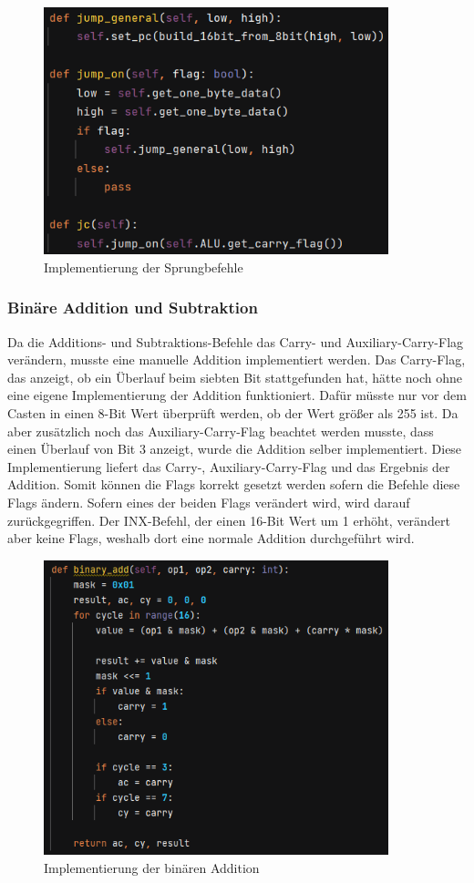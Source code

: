 \documentclass[12pt]{article}
\newcommand{\imgSpaceBefore}{\vspace{10pt}}
\begin{document}
\imgSpaceBefore
\begin{figure}[H]
\centering
\includegraphics[width=10cm]{Bilder/JumpVariants}
\caption{Implementierung der Sprungbefehle}
\label{fig:JumpVariants}
\end{figure}


\subsubsection{Binäre Addition und Subtraktion}
Da die Additions- und Subtraktions-Befehle das Carry- und Auxiliary-Carry-Flag verändern, musste eine manuelle Addition implementiert werden. Das Carry-Flag, das anzeigt, ob ein Überlauf beim siebten Bit stattgefunden hat, hätte noch ohne eine eigene Implementierung der Addition funktioniert. Dafür müsste nur vor dem Casten in einen 8-Bit Wert überprüft werden, ob der Wert größer als 255 ist. Da aber zusätzlich noch das Auxiliary-Carry-Flag beachtet werden musste, dass einen Überlauf von Bit 3 anzeigt, wurde die Addition selber implementiert. Diese Implementierung liefert das Carry-, Auxiliary-Carry-Flag und das Ergebnis der Addition. Somit können die Flags korrekt gesetzt werden sofern die Befehle diese Flags ändern. Sofern eines der beiden Flags verändert wird, wird darauf zurückgegriffen. Der INX-Befehl, der einen 16-Bit Wert um 1 erhöht, verändert aber keine Flags, weshalb dort eine normale Addition durchgeführt wird.

\imgSpaceBefore
\begin{figure}[H]
\centering
\includegraphics[width=10cm]{Bilder/binaere_addition}
\caption{Implementierung der binären Addition}
\label{fig:binaere_addition}
\end{figure}
\end{document}
